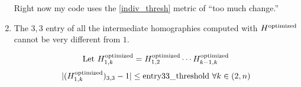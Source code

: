 \documentclass{article}
\begin{document}
\begin{enumerate}
\begin{enumerate}
\end{enumerate} 

Right now my code uses the \ref{indiv_thresh} metric of ``too much change.''

\item The $3, 3$ entry of all the intermediate homographies computed with
$H^{\textnormal{optimized}}$ cannot be very different from $1$.

\[\textnormal{Let } H_{1, k}^{\textnormal{optimized}} = H_{1, 2}^{\textnormal{optimized}} \cdots H_{k - 1, k}^{\textnormal{optimized}}\]
\[|(H_{1, k}^{\textnormal{optimized}})_{3, 3} - 1| \leq \textnormal{entry33\_threshold } \forall k \in (2, n)\]

\end{enumerate}
\end{document}
